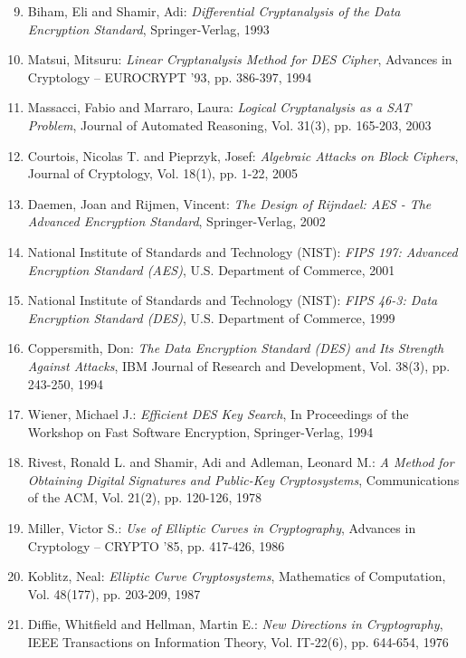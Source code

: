 ﻿\documentclass[12pt,a4paper]{article}
\begin{document}
	\begin{enumerate}
		\setcounter{enumi}{8}
		\item Biham, Eli and Shamir, Adi: \textit{Differential Cryptanalysis of the Data Encryption Standard}, Springer-Verlag, 1993
		\item Matsui, Mitsuru: \textit{Linear Cryptanalysis Method for DES Cipher}, Advances in Cryptology -- EUROCRYPT '93, pp. 386-397, 1994
		\item Massacci, Fabio and Marraro, Laura: \textit{Logical Cryptanalysis as a SAT Problem}, Journal of Automated Reasoning, Vol. 31(3), pp. 165-203, 2003
		\item Courtois, Nicolas T. and Pieprzyk, Josef: \textit{Algebraic Attacks on Block Ciphers}, Journal of Cryptology, Vol. 18(1), pp. 1-22, 2005
	\end{enumerate}
	
	\begin{enumerate}
		\setcounter{enumi}{12}
		\item Daemen, Joan and Rijmen, Vincent: \textit{The Design of Rijndael: AES - The Advanced Encryption Standard}, Springer-Verlag, 2002
		\item National Institute of Standards and Technology (NIST): \textit{FIPS 197: Advanced Encryption Standard (AES)}, U.S. Department of Commerce, 2001
		\item National Institute of Standards and Technology (NIST): \textit{FIPS 46-3: Data Encryption Standard (DES)}, U.S. Department of Commerce, 1999
		\item Coppersmith, Don: \textit{The Data Encryption Standard (DES) and Its Strength Against Attacks}, IBM Journal of Research and Development, Vol. 38(3), pp. 243-250, 1994
		\item Wiener, Michael J.: \textit{Efficient DES Key Search}, In Proceedings of the Workshop on Fast Software Encryption, Springer-Verlag, 1994
	\end{enumerate}
	
	\begin{enumerate}
		\setcounter{enumi}{17}
		\item Rivest, Ronald L. and Shamir, Adi and Adleman, Leonard M.: \textit{A Method for Obtaining Digital Signatures and Public-Key Cryptosystems}, Communications of the ACM, Vol. 21(2), pp. 120-126, 1978
		\item Miller, Victor S.: \textit{Use of Elliptic Curves in Cryptography}, Advances in Cryptology -- CRYPTO '85, pp. 417-426, 1986
		\item Koblitz, Neal: \textit{Elliptic Curve Cryptosystems}, Mathematics of Computation, Vol. 48(177), pp. 203-209, 1987
		\item Diffie, Whitfield and Hellman, Martin E.: \textit{New Directions in Cryptography}, IEEE Transactions on Information Theory, Vol. IT-22(6), pp. 644-654, 1976
	\end{enumerate}
	
\end{document}
